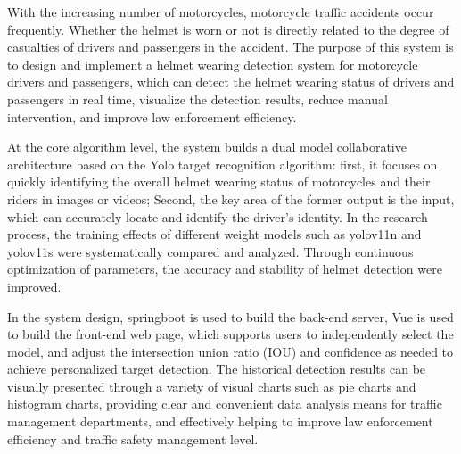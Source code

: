 With the increasing number of motorcycles, motorcycle traffic accidents occur frequently. Whether the helmet is worn or not is directly related to the degree of casualties of drivers and passengers in the accident. The purpose of this system is to design and implement a helmet wearing detection system for motorcycle drivers and passengers, which can detect the helmet wearing status of drivers and passengers in real time, visualize the detection results, reduce manual intervention, and improve law enforcement efficiency.

At the core algorithm level, the system builds a dual model collaborative architecture based on the Yolo target recognition algorithm: first, it focuses on quickly identifying the overall helmet wearing status of motorcycles and their riders in images or videos; Second, the key area of the former output is the input, which can accurately locate and identify the driver's identity. In the research process, the training effects of different weight models such as yolov11n and yolov11s were systematically compared and analyzed. Through continuous optimization of parameters, the accuracy and stability of helmet detection were improved.

In the system design, springboot is used to build the back-end server, Vue is used to build the front-end web page, which supports users to independently select the model, and adjust the intersection union ratio (IOU) and confidence as needed to achieve personalized target detection. The historical detection results can be visually presented through a variety of visual charts such as pie charts and histogram charts, providing clear and convenient data analysis means for traffic management departments, and effectively helping to improve law enforcement efficiency and traffic safety management level.